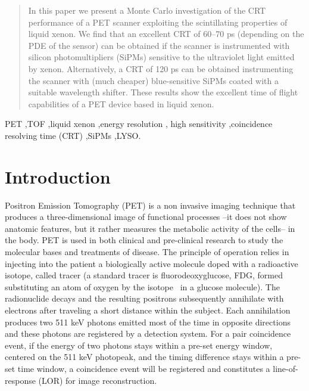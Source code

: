 \documentclass[review]{elsarticle}
\begin{document}
\begin{frontmatter}
\begin{abstract}
In this paper we present a Monte Carlo investigation of the CRT performance of a
PET scanner exploiting the scintillating properties of liquid xenon. We find that an excellent CRT of 60--70 ps (depending on the PDE of the sensor) can be obtained if the scanner is instrumented with silicon photomultipliers (SiPMs) sensitive to the ultraviolet light emitted by xenon. Alternatively, a CRT of 120 ps can be obtained instrumenting the scanner with (much cheaper) blue-sensitive SiPMs coated with a suitable wavelength shifter.
These results show the excellent time of flight capabilities of a PET device based in liquid xenon.   
 \end{abstract}

\begin{keyword}
PET \sep TOF \sep liquid xenon \sep energy resolution \sep
 high sensitivity \sep coincidence resolving time (CRT) \sep SiPMs \sep LYSO.
\end{keyword}

\end{frontmatter}



\section{Introduction}
Positron Emission Tomography (PET) is a non invasive imaging technique that produces a three-dimensional image of functional processes --it does not show anatomic features, but it rather  measures the metabolic activity of the cells-- in the body. PET is used in
both clinical and pre-clinical research to study the molecular bases and treatments of
disease. The principle of operation relies in injecting into the patient a  
biologically active molecule doped with a radioactive isotope, called tracer (a standard tracer is fluorodeoxyglucose, FDG, formed substituting an atom of oxygen by the isotope \FDG\ in a glucose molecule). The radionuclide decays and the resulting positrons
subsequently annihilate with electrons after traveling a short distance within the subject.
Each annihilation produces two 511 keV photons emitted most of the time in opposite
directions and these photons are registered by a detection system. For a pair coincidence event, if the energy of two photons stays within a
pre-set energy window, centered on the 511 keV photopeak, and the timing difference stays within a pre-set time window, a coincidence event will be registered and constitutes a line-of-response (LOR) for image
reconstruction.
\end{document}
